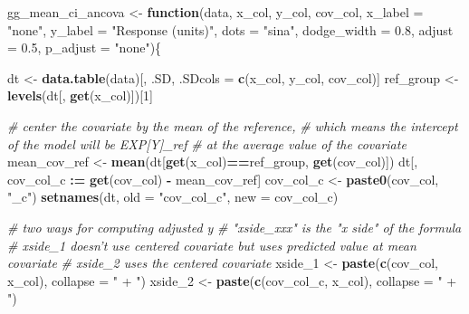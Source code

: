 \documentclass[]{book}
\newenvironment{Shaded}{\begin{snugshade}}{\end{snugshade}}
\newcommand{\CommentTok}[1]{\textcolor[rgb]{0.56,0.35,0.01}{\textit{#1}}}
\newcommand{\ControlFlowTok}[1]{\textcolor[rgb]{0.13,0.29,0.53}{\textbf{#1}}}
\newcommand{\DataTypeTok}[1]{\textcolor[rgb]{0.13,0.29,0.53}{#1}}
\newcommand{\DecValTok}[1]{\textcolor[rgb]{0.00,0.00,0.81}{#1}}
\newcommand{\ErrorTok}[1]{\textcolor[rgb]{0.64,0.00,0.00}{\textbf{#1}}}
\newcommand{\FloatTok}[1]{\textcolor[rgb]{0.00,0.00,0.81}{#1}}
\newcommand{\KeywordTok}[1]{\textcolor[rgb]{0.13,0.29,0.53}{\textbf{#1}}}
\newcommand{\NormalTok}[1]{#1}
\newcommand{\OperatorTok}[1]{\textcolor[rgb]{0.81,0.36,0.00}{\textbf{#1}}}
\newcommand{\StringTok}[1]{\textcolor[rgb]{0.31,0.60,0.02}{#1}}
\begin{document}
\begin{Shaded}
\begin{Highlighting}[]
\NormalTok{gg_mean_ci_ancova <-}\StringTok{ }\ControlFlowTok{function}\NormalTok{(data,}
\NormalTok{                       x_col,}
\NormalTok{                       y_col,}
\NormalTok{                       cov_col,}
                       \DataTypeTok{x_label =} \StringTok{"none"}\NormalTok{,}
                       \DataTypeTok{y_label =} \StringTok{"Response (units)"}\NormalTok{,}
                       \DataTypeTok{dots =} \StringTok{"sina"}\NormalTok{,}
                       \DataTypeTok{dodge_width =} \FloatTok{0.8}\NormalTok{,}
                       \DataTypeTok{adjust =} \FloatTok{0.5}\NormalTok{,}
                       \DataTypeTok{p_adjust =} \StringTok{"none"}\NormalTok{)\{}
  
\NormalTok{  dt <-}\StringTok{ }\KeywordTok{data.table}\NormalTok{(data)[, .SD, .SDcols =}\StringTok{ }\KeywordTok{c}\NormalTok{(x_col, y_col, cov_col)]}
\NormalTok{  ref_group <-}\StringTok{ }\KeywordTok{levels}\NormalTok{(dt[, }\KeywordTok{get}\NormalTok{(x_col)])[}\DecValTok{1}\NormalTok{]}
  
  \CommentTok{# center the covariate by the mean of the reference, }
  \CommentTok{# which means the intercept of the model will be EXP[Y]_ref}
  \CommentTok{# at the average value of the covariate}
\NormalTok{  mean_cov_ref <-}\StringTok{ }\KeywordTok{mean}\NormalTok{(dt[}\KeywordTok{get}\NormalTok{(x_col)}\OperatorTok{==}\NormalTok{ref_group, }\KeywordTok{get}\NormalTok{(cov_col)])}
\NormalTok{  dt[, cov_col_c }\OperatorTok{:}\ErrorTok{=}\StringTok{ }\KeywordTok{get}\NormalTok{(cov_col) }\OperatorTok{-}\StringTok{ }\NormalTok{mean_cov_ref]}
\NormalTok{  cov_col_c <-}\StringTok{ }\KeywordTok{paste0}\NormalTok{(cov_col, }\StringTok{"_c"}\NormalTok{)}
  \KeywordTok{setnames}\NormalTok{(dt, }\DataTypeTok{old =} \StringTok{"cov_col_c"}\NormalTok{, }\DataTypeTok{new =}\NormalTok{ cov_col_c)}
  
  \CommentTok{# two ways for computing adjusted y}
  \CommentTok{# "xside_xxx" is the "x side" of the formula}
  \CommentTok{# xside_1 doesn't use centered covariate but uses predicted value at mean covariate}
  \CommentTok{# xside_2 uses the centered covariate}
\NormalTok{  xside_}\DecValTok{1}\NormalTok{ <-}\StringTok{ }\KeywordTok{paste}\NormalTok{(}\KeywordTok{c}\NormalTok{(cov_col, x_col), }\DataTypeTok{collapse =} \StringTok{" + "}\NormalTok{)}
\NormalTok{  xside_}\DecValTok{2}\NormalTok{ <-}\StringTok{ }\KeywordTok{paste}\NormalTok{(}\KeywordTok{c}\NormalTok{(cov_col_c, x_col), }\DataTypeTok{collapse =} \StringTok{" + "}\NormalTok{)}
  

\end{Highlighting}
\end{Shaded}
\end{document}
